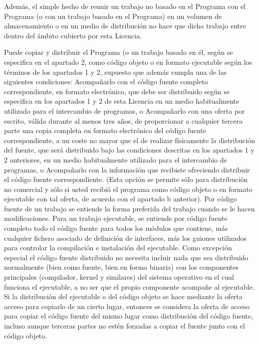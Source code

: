 Además, el simple hecho de reunir un trabajo no basado en el Programa con el Programa (o con un trabajo basado en el Programa) en un volumen de almacenamiento o en un medio de distribución no hace que dicho trabajo entre dentro del ámbito cubierto por esta Licencia.

Puede copiar y distribuir el Programa (o un trabajo basado en él, según se especifica en el apartado 2, como código objeto o en formato ejecutable según los términos de los apartados 1 y 2, supuesto que además cumpla una de las siguientes condiciones:
Acompañarlo con el código fuente completo correspondiente, en formato electrónico, que debe ser distribuido según se especifica en los apartados 1 y 2 de esta Licencia en un medio habitualmente utilizado para el intercambio de programas, o
Acompañarlo con una oferta por escrito, válida durante al menos tres años, de proporcionar a cualquier tercera parte una copia completa en formato electrónico del código fuente correspondiente, a un coste no mayor que el de realizar físicamente la distribución del fuente, que será distribuido bajo las condiciones descritas en los apartados 1 y 2 anteriores, en un medio habitualmente utilizado para el intercambio de programas, o
Acompañarlo con la información que recibiste ofreciendo distribuir el código fuente correspondiente. (Esta opción se permite sólo para distribución no comercial y sólo si usted recibió el programa como código objeto o en formato ejecutable con tal oferta, de acuerdo con el apartado b anterior).
Por código fuente de un trabajo se entiende la forma preferida del trabajo cuando se le hacen modificaciones. Para un trabajo ejecutable, se entiende por código fuente completo todo el código fuente para todos los módulos que contiene, más cualquier fichero asociado de definición de interfaces, más los guiones utilizados para controlar la compilación e instalación del ejecutable. Como excepción especial el código fuente distribuido no necesita incluir nada que sea distribuido normalmente (bien como fuente, bien en forma binaria) con los componentes principales (compilador, kernel y similares) del sistema operativo en el cual funciona el ejecutable, a no ser que el propio componente acompañe al ejecutable.
Si la distribución del ejecutable o del código objeto se hace mediante la oferta acceso para copiarlo de un cierto lugar, entonces se considera la oferta de acceso para copiar el código fuente del mismo lugar como distribución del código fuente, incluso aunque terceras partes no estén forzadas a copiar el fuente junto con el código objeto.


